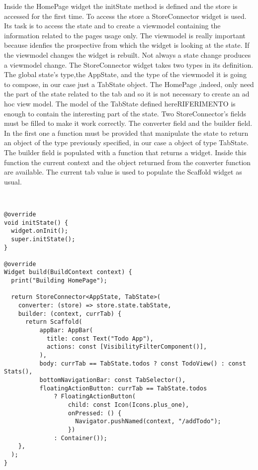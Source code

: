 Inside the HomePage widget the initState method is defined and the store is accessed for the first time. To access the store a StoreConnector widget is used. Its task is to access the state and to create a viewmodel containing the information related to the pages usage only. The viewmodel is really important because idenfies the prospective from which the widget is looking at the state. If the viewmodel changes the widget is rebuilt. Not always a state change produces a viewmodel change. The StoreConnector widget takes two types in its definition. The global state’s type,the AppState, and the type of the viewmodel it is going to compose, in our case just a TabState object. The HomePage ,indeed, only need the part of the state related to the tab and so it is not necessary to create an ad hoc view model. The model of the TabState defined hereRIFERIMENTO is enough to contain the interesting part of the state.  Two StoreConnector’s fields must be filled to make it work correctly. The converter field and the builder field. In the first one a function must be provided that manipulate the state to return an object of the type previously specified, in our case a object of type TabState. The builder field is populated with a function that returns a widget. Inside this function the current context and the object returned from the converter function are available. The current tab value is used to populate the Scaffold widget as usual.
\begin{code}
\mbox{}\\
 \mbox{}
		\label{code:2.14}
\begin{verbatim}
@override
void initState() {
  widget.onInit();
  super.initState();
}

@override
Widget build(BuildContext context) {
  print("Building HomePage");

  return StoreConnector<AppState, TabState>(
    converter: (store) => store.state.tabState,
    builder: (context, currTab) {
      return Scaffold(
          appBar: AppBar(
            title: const Text("Todo App"),
            actions: const [VisibilityFilterComponent()],
          ),
          body: currTab == TabState.todos ? const TodoView() : const Stats(),
          bottomNavigationBar: const TabSelector(),
          floatingActionButton: currTab == TabState.todos
              ? FloatingActionButton(
                  child: const Icon(Icons.plus_one),
                  onPressed: () {
                    Navigator.pushNamed(context, "/addTodo");
                  })
              : Container());
    },
  );
}
\end{verbatim}
\mbox{}
\end{code}

